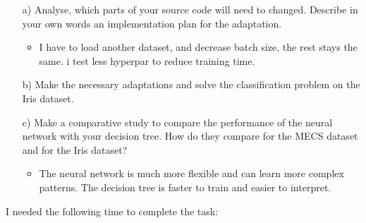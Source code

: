 \documentclass{article}
\begin{document}
\begin{enumerate}

\item[a)] Analyse, which parts of your source code will need to changed. Describe in your own words an implementation plan for the adaptation.
\begin{itemize}
    \item I have to load another dataset, and decrease batch size, the rest stays the same. i test less hyperpar to reduce training time.
\end{itemize}
\item[b)] Make the necessary adaptations and solve the classification problem on the Iris dataset.

\item[c)] Make a comparative study to compare the performance of the neural network with your decision tree. How do they compare for the MECS dataset and for the Iris dataset?
\begin{itemize}
    \item The neural network is much more flexible and can learn more complex patterns. The decision tree is faster to train and easier to interpret.
\end{itemize}
\end{enumerate}

I needed the following time to complete the task:
\end{document}
